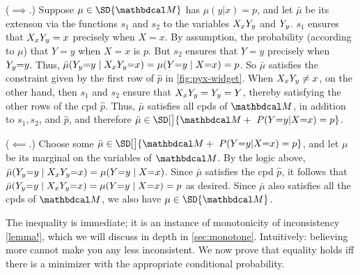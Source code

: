 \begin{subappendices}
\begin{lproof}\label{proof:individual-prob-1}
    ($\implies$.)
    Suppose $\mu \in \SD{\dg M}$ has $\mu(y|x) = p$, and let $\bar\mu$ be its extenson via the functions $s_1$ and $s_2$ to the variables ${X_x Y_y}$ and ${Y_y}$. 
    $s_1$ ensures that ${X_x Y_y} = x$ precisely when $X = x$. 
    By assumption, the probability (according to $\mu$) that $Y{=}y$
    when $X{=}x$ is $p$. But $s_2$ ensures that $Y{=}y$ precisely when ${Y_y}{=}y$. 
    Thus,
    $\bar\mu({Y_y} {=} y \mid {X_x Y_y} {=} x) = \mu(Y{=}y \mid X{=}x) = p$.
    So $\bar \mu$ satisfies the constraint given by the first row of $\hat p$
        in \cref{fig:pyx-widget}.
    When ${X_x Y_y} \ne x$, on the other hand, then $s_1$ and $s_2$ ensure
    that ${X_x Y_y} = {Y_y} = Y$, thereby satisfying the other rows 
    of the cpd $\hat p$. 
    Thus, $\bar \mu$ satisfies all cpds of $\dg M$, in addition to $s_1, s_2$, and $\hat p$, and therefore $\bar\mu \in \SD[\big]{\dg M + ~\Pr(Y{=}y|X{=}x) = p}$.
    
    ($\impliedby$.)
    Choose some $\bar\mu \in \SD[\big]{\dg M + ~\Pr(Y{=}y|X{=}x) = p}$,
    and let $\mu$ be its marginal on the variables of $\dg M$. 
    By the logic above, $\bar\mu({Y_y} {=} y \mid {X_x Y_y} {=} x) = \mu(Y{=}y \mid X{=}x)$.
    Since $\bar\mu$ satisfies the cpd $\hat p$, it follows that $\bar\mu({Y_y} {=} y \mid {X_x Y_y} {=} x) = \mu(Y{=}y \mid X{=}x) = p$ as desired.
    Since $\bar\mu$ also satisfies all the cpds of $\dg M$, we also have $\mu \in \SD{\dg M}$.
\end{lproof}

\begin{lproof}  
        \label{proof:indiv-prob-inc-conditional}
    The inequality is immediate; it is an instance of monotonicity of inconsistency
    \cref{lemma!},
    which we will discuss in depth in \cref{sec:monotone}. Intuitively: believing more cannot make you any less
    inconsistent.  We now prove that equality holds iff there is a minimizer with the appropriate conditional probability.


\end{lproof}
\end{subappendices}
